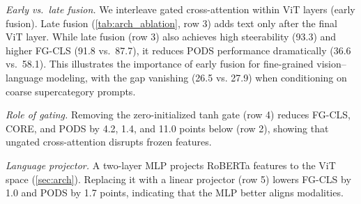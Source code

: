 \textit{Early vs.\ late fusion.}
We interleave gated cross-attention within ViT layers (early fusion).  
Late fusion (\cref{tab:arch_ablation}, row 3) adds text only after the final ViT layer.  
While late fusion (row 3) also achieves high steerability (93.3) and higher FG-CLS (91.8 vs.\ 87.7), it reduces PODS performance dramatically (36.6 vs.\ 58.1).
This illustrates the importance of early fusion for fine-grained vision–language modeling, with the gap vanishing (26.5 vs. 27.9) when conditioning on coarse supercategory prompts.

\textit{Role of gating.}
Removing the zero-initialized tanh gate (row 4) reduces FG-CLS, CORE, and PODS by 4.2, 1.4, and 11.0 points below \model{} (row 2), showing that ungated cross-attention disrupts frozen features.
         
\textit{Language projector.}
A two-layer MLP projects RoBERTa features to the ViT space (\cref{sec:arch}).  
Replacing it with a linear projector (row 5) lowers FG-CLS by 1.0 and PODS by 1.7 points, indicating that the MLP better aligns modalities.




